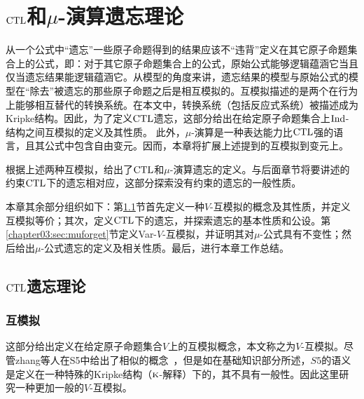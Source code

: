 
\chapter{$\textrm{CTL}$和$\mu$-演算遗忘理论}
\label{chapter03}
{\em 

从一个公式中“遗忘”一些原子命题得到的结果应该不“违背”定义在其它原子命题集合上的公式，即：对于其它原子命题集合上的公式，原始公式能够逻辑蕴涵它当且仅当遗忘结果能逻辑蕴涵它。从模型的角度来讲，遗忘结果的模型与原始公式的模型在“除去”被遗忘的那些原子命题之后是相互模拟的。互模拟描述的是两个在行为上能够相互替代的转换系统\cite{Baier:PMC:2008}。在本文中，转换系统（包括反应式系统）被描述成为Kripke结构。因此，为了定义$\textrm{CTL}$遗忘，这部分给出在给定原子命题集合上$\textrm{Ind}$-结构之间互模拟的定义及其性质。
此外，$\mu$-演算是一种表达能力比$\textrm{CTL}$强的语言，且其公式中包含自由变元。因而，本章将扩展上述提到的互模拟到变元上。

根据上述两种互模拟，给出了$\textrm{CTL}$和$\mu$-演算遗忘的定义。与后面章节将要讲述的约束$\textrm{CTL}$下的遗忘相对应，这部分探索没有约束的遗忘的一般性质。

本章其余部分组织如下：第\ref{chapter03:sec:ctlforget}节首先定义一种$V$-互模拟的概念及其性质，并定义互模拟等价；其次，定义$\textrm{CTL}$下的遗忘，并探索遗忘的基本性质和公设。第\ref{chapter03:sec:muforget}节定义Var-$V$-互模拟，并证明其对$\mu$-公式具有不变性；然后给出$\mu$-公式遗忘的定义及相关性质。最后，进行本章工作总结。}

\section{$\textrm{CTL}$遗忘理论}
\label{chapter03:sec:ctlforget}

\subsection{互模拟}
这部分给出定义在给定原子命题集合$V$上的互模拟概念，本文称之为$V$-互模拟。尽管zhang等人在S5中给出了相似的概念~\cite{Yan:AIJ:2009}，但是如在基础知识部分所述，$S5$的语义是定义在一种特殊的Kripke结构（$\textsc{k}$-解释）下的，其不具有一般性。因此这里研究一种更加一般的$V$-互模拟。


